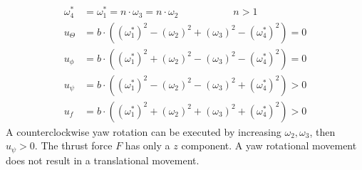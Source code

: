 \begin{align*}
	\omega_4^* &= \omega_1^* = n \cdot \omega_3 = n \cdot \omega_2 \qquad \qquad \quad \enspace  n > 1\\
	u_{\Theta} &= b \cdot ((\omega_1^*)^2 - (\omega_2)^2 + (\omega_3)^2 - (\omega_4^*)^2) = 0\\
	u_{\phi} &= b \cdot ((\omega_1^*)^2 + (\omega_2)^2 - (\omega_3)^2 - (\omega_4^*)^2) = 0 \\
	u_{\psi} &= b \cdot ((\omega_1^*)^2 - (\omega_2)^2 - (\omega_3)^2 + (\omega_4^*)^2)	> 0 \\
	u_f &= b \cdot ((\omega_1^*)^2 + (\omega_2)^2 + (\omega_3)^2 + (\omega_4^*)^2) > 0 
\end{align*}
\newline
A counterclockwise yaw rotation can be executed by increasing $\omega_2, \omega_3$, then $u_{\psi} > 0$.
The thrust force $F$ has only a $z$ component. A yaw rotational movement does not result in a translational movement.

 \newpage
 
